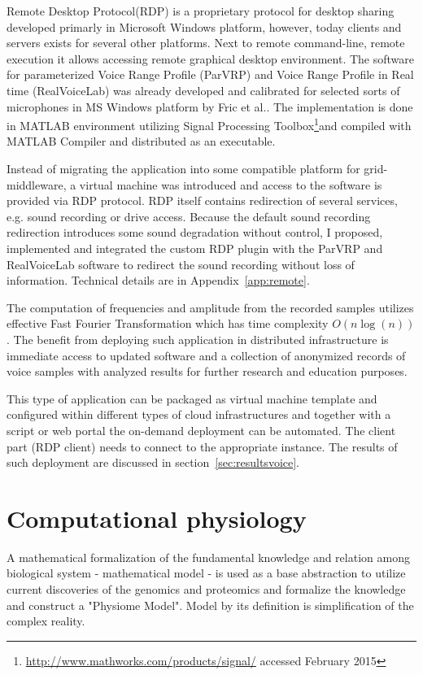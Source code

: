 Remote Desktop Protocol(RDP) is a proprietary protocol for desktop sharing developed primarly in Microsoft Windows platform, however, today clients and servers exists for several other platforms. Next to remote command-line, remote execution it allows accessing remote graphical desktop environment. %
The software for parameterized Voice Range Profile (ParVRP) and Voice Range Profile in Real time (RealVoiceLab) was already developed and calibrated for selected sorts of microphones in MS Windows platform by Fric et al.\cite{Fric2007,Fric2012}. The implementation is done in MATLAB environment utilizing Signal Processing Toolbox\footnote{\url{http://www.mathworks.com/products/signal/} accessed February 2015}and compiled with MATLAB Compiler and distributed as an executable.

Instead of migrating the application into some compatible platform for grid-middleware, a virtual machine was introduced and access to the software is provided via RDP protocol. RDP itself contains redirection of several services, e.g. sound recording or drive access. Because the default sound recording redirection introduces some sound degradation without control, I proposed, implemented and integrated the custom RDP plugin with the ParVRP and RealVoiceLab software to redirect the sound recording without loss of information. Technical details are in Appendix~\ref{app:remote}. 

The computation of frequencies and amplitude from the recorded samples utilizes effective Fast Fourier Transformation which has time complexity $O(n\log(n))$. The benefit from deploying such application in distributed infrastructure is immediate access to updated software and a collection of anonymized records of voice samples with analyzed results for further research and education purposes.

This type of application can be packaged as virtual machine template and configured within different types of cloud infrastructures and together with a script or web portal the on-demand deployment can be automated. The client part (RDP client) needs to connect to the appropriate instance. The results of such deployment are discussed in section~\ref{sec:resultsvoice}.

\section{Computational physiology}
\label{sec:models}
A mathematical formalization of the fundamental knowledge and relation among biological system - mathematical model - is used as a base abstraction to utilize current discoveries of the genomics and proteomics and formalize the knowledge and construct a "Physiome Model". Model by its definition is simplification of the complex reality.

